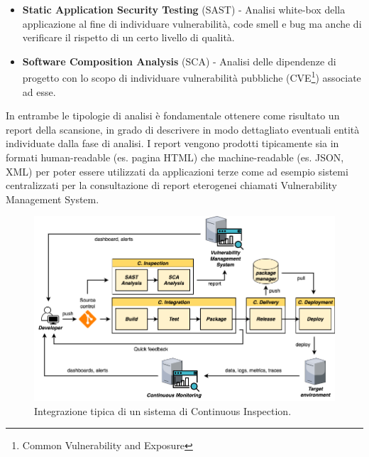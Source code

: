 \begin{itemize}
    \item \textbf{Static Application Security Testing} (SAST) - Analisi white-box della applicazione al fine di individuare vulnerabilità, code smell e bug ma anche di verificare il rispetto di un certo livello di qualità.
    \item \textbf{Software Composition Analysis} (SCA) - Analisi delle dipendenze di progetto con lo scopo di individuare vulnerabilità pubbliche (CVE\footnote{Common Vulnerability and Exposure}) associate ad esse.
\end{itemize}

In entrambe le tipologie di analisi è fondamentale ottenere come risultato un report della scansione, in grado di descrivere in modo dettagliato eventuali entità individuate dalla fase di analisi. I report vengono prodotti tipicamente sia in formati human-readable (es. pagina HTML) che machine-readable (es. JSON, XML) per poter essere utilizzati da applicazioni terze come ad esempio sistemi centralizzati per la consultazione di report eterogenei chiamati Vulnerability Management System.

\begin{figure}[H]
    \centering
    \includegraphics[width=1\textwidth]{img/cinspection-pipeline.png}
    \caption{Integrazione tipica di un sistema di Continuous Inspection.}
    \label{ci-inspection-pipeline}
\end{figure}

